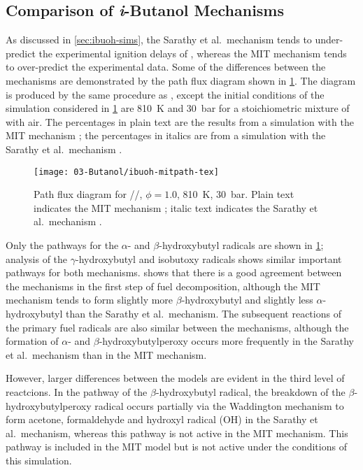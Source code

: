\documentclass[../main.tex]{subfiles}
\begin{document}
\subsection{Comparison of \textit{i}-Butanol Mechanisms}
\label{sec:ibuoh-discussion}

As discussed in \cref{sec:ibuoh-sims}, the Sarathy et al.\ mechanism
\cite{Sarathy2012} tends to under-predict the experimental ignition
delays of \iBuOH{}, whereas the MIT mechanism \cite{Weber2013a} tends to
over-predict the experimental data. Some of the differences between the
mechanisms are demonstrated by the path flux diagram shown in
\cref{fig:ibuoh-mitpath}. The diagram is produced by the same procedure
as , except the initial
conditions of the simulation considered in \cref{fig:ibuoh-mitpath} are
\SI{810}{\kelvin} and \SI{30}{\bar} for a stoichiometric mixture of
\iBuOH{} with air. The percentages in plain text are the results from a
simulation with the MIT mechanism \cite{Weber2013a}; the percentages in
italics are from a simulation with the Sarathy et al.\ mechanism
\cite{Sarathy2012}.

\begin{figure}
    \texttt{[image: 03-Butanol/ibuoh-mitpath-tex]}
    \caption{Path flux diagram for \iBuOH{}//, $\phi=1.0$,
    \SI{810}{\kelvin}, \SI{30}{\bar}. Plain text indicates the MIT
    mechanism \cite{Weber2013a}; italic text indicates the Sarathy et al.\ mechanism
    \cite{Sarathy2012}.}
    \label{fig:ibuoh-mitpath}
\end{figure}

Only the pathways for the $\alpha$- and $\beta$-hydroxybutyl radicals
are shown in \cref{fig:ibuoh-mitpath}; analysis of the $\gamma$-hydroxybutyl
and isobutoxy radicals shows similar important pathways for both mechanisms.
 shows that there is a good agreement between
the mechanisms in the first step of fuel decomposition, although the MIT
mechanism tends to form slightly more $\beta$-hydroxybutyl and slightly
less $\alpha$-hydroxybutyl than the Sarathy et al.\ mechanism. The
subsequent reactions of the primary fuel radicals are also similar
between the mechanisms, although the formation of $\alpha$- and
$\beta$-hydroxybutylperoxy occurs more frequently in the Sarathy et al.\
mechanism than in the MIT mechanism.

However, larger differences between the models are evident in the third level
of reactcions. In the pathway of the $\beta$-hydroxybutyl radical, the breakdown
of the $\beta$\hyp{}hydroxybutylperoxy radical occurs partially via the Waddington
mechanism to form acetone, formaldehyde and hydroxyl radical (OH) in the
Sarathy et al.\ mechanism, whereas this pathway is not active in the
MIT mechanism. This pathway is included in the MIT model but is not
active under the conditions of this simulation.
\end{document}
